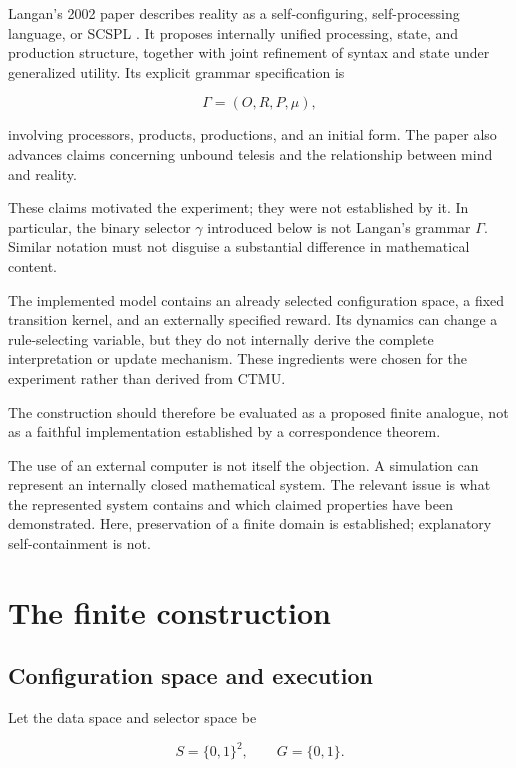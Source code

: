 \documentclass[11pt]{article}
\theoremstyle{remark}
\begin{document}
Langan's 2002 paper describes reality as a self-configuring, self-processing language, or SCSPL \cite{langan2002}. It proposes internally unified processing, state, and production structure, together with joint refinement of syntax and state under generalized utility. Its explicit grammar specification is

\begin{equation}
\Gamma=(O,R,P,\mu),
\end{equation}

involving processors, products, productions, and an initial form. The paper also advances claims concerning unbound telesis and the relationship between mind and reality.

These claims motivated the experiment; they were not established by it. In particular, the binary selector \(\gamma\) introduced below is not Langan's grammar \(\Gamma\). Similar notation must not disguise a substantial difference in mathematical content.

The implemented model contains an already selected configuration space, a fixed transition kernel, and an externally specified reward. Its dynamics can change a rule-selecting variable, but they do not internally derive the complete interpretation or update mechanism. These ingredients were chosen for the experiment rather than derived from CTMU.

The construction should therefore be evaluated as a proposed finite analogue, not as a faithful implementation established by a correspondence theorem.

The use of an external computer is not itself the objection. A simulation can represent an internally closed mathematical system. The relevant issue is what the represented system contains and which claimed properties have been demonstrated. Here, preservation of a finite domain is established; explanatory self-containment is not.

\section{The finite construction}

\subsection{Configuration space and execution}

Let the data space and selector space be

\begin{equation}
S=\{0,1\}^{2},
\qquad
G=\{0,1\}.
\end{equation}
\end{document}
